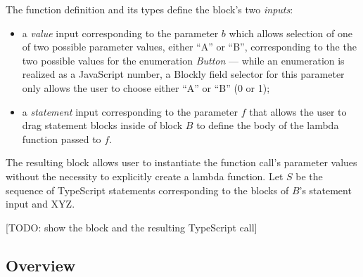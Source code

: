 The function definition and its types define the block's two \emph{inputs}:
\begin{itemize}
\item  a \emph{value} input corresponding to the parameter
$b$ which allows selection of one of two 
possible parameter values, either ``A'' or ``B'', corresponding to the
the two possible values for the enumeration \emph{Button} ---
while an enumeration is realized as a JavaScript number, a 
Blockly field selector for this parameter only allows
the user to choose either ``A'' or ``B'' (0 or 1);
\item a \emph{statement} input corresponding to the parameter $f$
that allows the user to drag statement blocks inside of block $B$
to define the body of the lambda function passed to $f$.
\end{itemize}
The resulting block allows user to instantiate the function call's
parameter values without the necessity to explicitly create a 
lambda function.  Let $S$ be the sequence of TypeScript statements
corresponding to the blocks of $B$'s statement input and XYZ. 

[TODO: show the block and the resulting TypeScript call]



\subsection{Overview}





